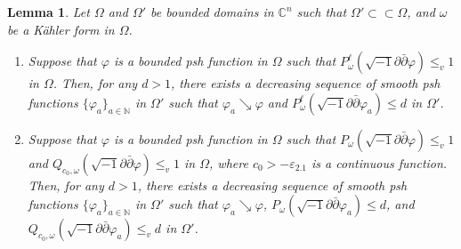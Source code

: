 \documentclass{amsart}
\numberwithin{equation}{section}
\theoremstyle{plain}
\newtheorem{lem}[equation]{Lemma}
\theoremstyle{definition}
\theoremstyle{remark}
\newcommand{\delb}{\sqrt{-1}\partial\bar{\partial}}
\begin{document}
\begin{lem}\label{lem:app}
    Let $\Omega$ and $\Omega'$ be bounded domains in $\mathbb{C}^n$ such that $\Omega'\subset\subset\Omega$, and $\omega$ be a Kähler form in $\Omega$. \begin{enumerate}[label={\upshape(\roman*)}]
        \item\label{item:appP} Suppose that $\varphi$ is a bounded psh function in $\Omega$ such that $P^\ell_{\omega}(\delb \varphi)\le_v1$ in $\Omega$. Then, for any $d>1$, there exists a decreasing sequence of smooth psh functions $\{\varphi_a\}_{a\in\mathbb{N}}$ in $\Omega'$ such that $\varphi_a\searrow\varphi$ and $P^\ell_\omega(\delb \varphi_a)\le d$ in $\Omega'$.
        \item\label{item:appQ} Suppose that $\varphi$ is a bounded psh function in $\Omega$ such that $P_{\omega}(\delb \varphi)\le_v1$ and $Q_{c_0,\omega}(\delb \varphi)\le_v1$ in $\Omega$, where $c_0>-\varepsilon_{2.1}$ is a continuous function. Then, for any $d>1$, there exists a decreasing sequence of smooth psh functions $\{\varphi_a\}_{a\in\mathbb{N}}$ in $\Omega'$ such that $\varphi_a\searrow\varphi$, $P_\omega(\delb \varphi_a)\le d$, and $Q_{c_0,\omega}(\delb \varphi_a)\le_v d$ in $\Omega'$.
    \end{enumerate}
\end{lem}
\end{document}
